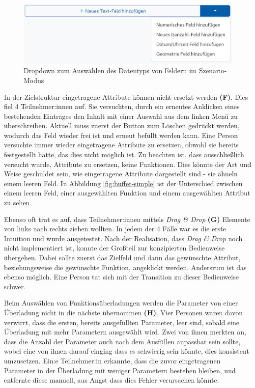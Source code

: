 \begin{figure}
  \centering
  \includegraphics[width=.9\textwidth]{assets/datatype-dropdown.png}
  \caption{Dropdown zum Auswählen des Datentyps von Feldern im Szenario-Modus}
  \label{fig:type-dropdown}
\end{figure}

In der Zielstruktur eingetragene Attribute können nicht ersetzt werden \textbf{(F)}. Dies fiel 4 Teilnehmer:innen auf. Sie versuchten, durch ein erneutes Anklicken eines bestehenden Eintrages den Inhalt mit einer Auswahl aus dem linken Menü zu überschreiben. Aktuell muss zuerst der Button zum Löschen gedrückt werden, wodurch das Feld wieder frei ist und erneut befüllt werden kann. Eine Person versuchte immer wieder eingetragene Attribute zu ersetzen, obwohl sie bereits festgestellt hatte, das dies nicht möglich ist. Zu beachten ist, dass ausschließlich versucht wurde, Attribute zu ersetzen, keine Funktionen. Dies könnte der Art und Weise geschuldet sein, wie eingetragene Attribute dargestellt sind - sie ähneln einem leeren Feld. In Abbildung \ref{fig:buffet-simple} ist der Unterschied zwischen einem leeren Feld, einer ausgewählten Funktion und einem ausgewählten Attribut zu sehen.

Ebenso oft trat es auf, dass Teilnehmer:innen mittels \textit{Drag \& Drop} \textbf{(G)} Elemente von links nach rechts ziehen wollten. In jedem der 4 Fälle war es die erste Intuition und wurde ausgetestet. Nach der Realisation, dass \textit{Drag \& Drop} noch nicht implementiert ist, konnte der Großteil zur konzipierten Bedienweise übergehen. Dabei sollte zuerst das Zielfeld und dann das gewünschte Attribut, beziehungsweise die gewünschte Funktion, angeklickt werden. Andersrum  ist das ebenso möglich. Eine Person tat sich mit der Transition zu dieser Bedienweise schwer.

Beim Auswählen von Funktionsüberladungen werden die Parameter von einer Überladung nicht in die nächste übernommen \textbf{(H)}. Vier Personen waren davon verwirrt, dass die ersten, bereits ausgefüllten Parameter, leer sind, sobald eine Überladung mit mehr Parametern ausgewählt wird. Zwei von ihnen merkten an, dass die Anzahl der Parameter auch nach dem Ausfüllen anpassbar sein sollte, wobei eine von ihnen darauf einging dass es schwierig sein könnte, dies konsistent umzusetzen. Ein:e Teilnehmer:in erkannte, dass die zuvor eingetragenen Parameter in der Überladung mit weniger Parametern bestehen bleiben, und entfernte diese manuell, aus Angst dass dies Fehler verursachen könnte.

